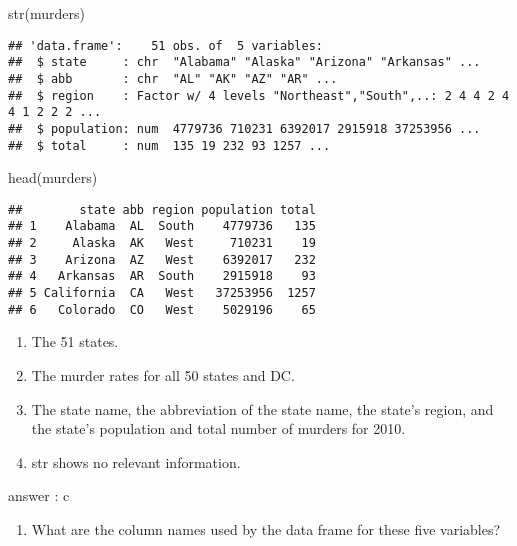 \documentclass[
]{article}
\newenvironment{Shaded}{\begin{snugshade}}{\end{snugshade}}
\newcommand{\FunctionTok}[1]{\textcolor[rgb]{0.00,0.00,0.00}{#1}}
\newcommand{\NormalTok}[1]{#1}
\providecommand{\tightlist}{%
  \setlength{\itemsep}{0pt}\setlength{\parskip}{0pt}}
\begin{document}
\begin{Shaded}
\begin{Highlighting}[]
\FunctionTok{str}\NormalTok{(murders)}
\end{Highlighting}
\end{Shaded}

\begin{verbatim}
## 'data.frame':    51 obs. of  5 variables:
##  $ state     : chr  "Alabama" "Alaska" "Arizona" "Arkansas" ...
##  $ abb       : chr  "AL" "AK" "AZ" "AR" ...
##  $ region    : Factor w/ 4 levels "Northeast","South",..: 2 4 4 2 4 4 1 2 2 2 ...
##  $ population: num  4779736 710231 6392017 2915918 37253956 ...
##  $ total     : num  135 19 232 93 1257 ...
\end{verbatim}

\begin{Shaded}
\begin{Highlighting}[]
\FunctionTok{head}\NormalTok{(murders)}
\end{Highlighting}
\end{Shaded}

\begin{verbatim}
##        state abb region population total
## 1    Alabama  AL  South    4779736   135
## 2     Alaska  AK   West     710231    19
## 3    Arizona  AZ   West    6392017   232
## 4   Arkansas  AR  South    2915918    93
## 5 California  CA   West   37253956  1257
## 6   Colorado  CO   West    5029196    65
\end{verbatim}

\begin{enumerate}
\def\labelenumi{\alph{enumi}.}
\tightlist
\item
  The 51 states.
\item
  The murder rates for all 50 states and DC.
\item
  The state name, the abbreviation of the state name, the state's
  region, and the state's population and total number of murders for
  2010.
\item
  str shows no relevant information.
\end{enumerate}

answer : c

\begin{enumerate}
\def\labelenumi{\arabic{enumi}.}
\setcounter{enumi}{1}
\tightlist
\item
  What are the column names used by the data frame for these five
  variables?
\end{enumerate}
\end{document}
